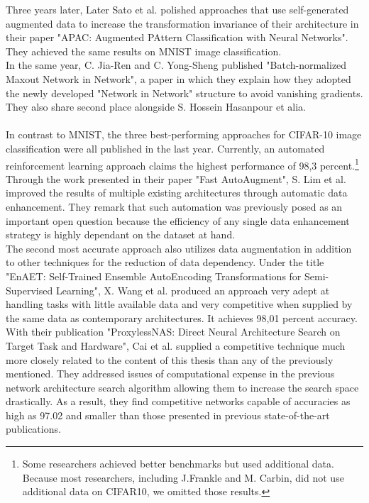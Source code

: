 Three years later, Later Sato et al. polished approaches that use self-generated augmented data to increase the transformation invariance of their architecture in their paper "APAC: Augmented PAttern Classification with Neural Networks". They achieved the same results on MNIST image classification.\cite{APAC}\\
In the same year, C. Jia-Ren and C. Yong-Sheng published "Batch-normalized Maxout Network in Network", a paper in which they explain how they adopted the newly developed "Network in Network" structure to avoid vanishing gradients.\cite{Batch-Normalized}\\
 They also share second place alongside S. Hossein Hasanpour et alia.\cite{Keep-It-Simple}\\
\\
\newpage
In contrast to MNIST, the three best-performing approaches for CIFAR-10 image classification were all published in the last year. Currently, an automated reinforcement learning approach claims the highest performance of 98,3 percent.\footnote{Some researchers achieved better benchmarks but used additional data. Because most researchers, including J.Frankle and M. Carbin, did not use additional data on CIFAR10, we omitted those results.}
Through the work presented in their paper "Fast AutoAugment", S. Lim et al. improved the results of multiple existing architectures through automatic data enhancement. They remark that such automation was previously posed as an important open question because the efficiency of any single data enhancement strategy is highly dependant on the dataset at hand.\cite{Auto-Augment}\\
The second most accurate approach also utilizes data augmentation in addition to other techniques for the reduction of data dependency. Under the title "EnAET: Self-Trained Ensemble AutoEncoding Transformations for Semi-Supervised Learning", X. Wang et al. produced an approach very adept at handling tasks with little available data and very competitive when supplied by the same data as contemporary architectures. It achieves 98,01 percent accuracy.\cite{EnAET}\\
With their publication "ProxylessNAS: Direct Neural Architecture Search on Target Task and Hardware", Cai et al. supplied a competitive technique much more closely related to the content of this thesis than any of the previously mentioned. They addressed issues of computational expense in the previous network architecture search algorithm allowing them to increase the search space drastically. As a result, they find competitive networks capable of accuracies as high as 97.02 and smaller than those presented in previous state-of-the-art publications.\cite{Direct-NAS}\\
